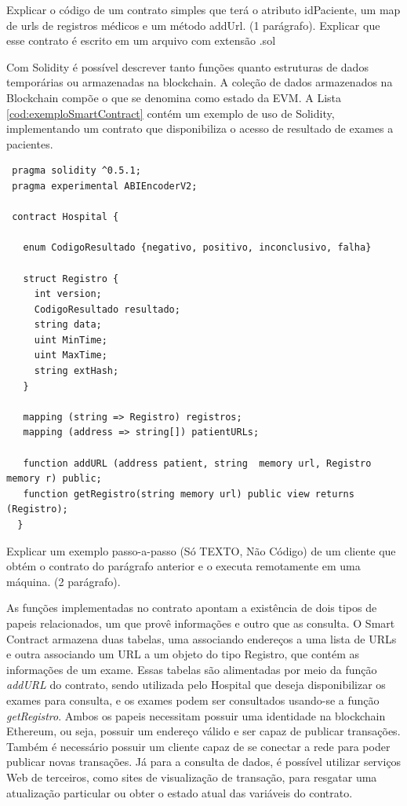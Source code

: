 \documentclass[a4paper,11pt]{article}
\begin{document}
{\color{ForestGreen}Explicar o código de um contrato simples que terá o atributo idPaciente, um map de urls de registros médicos e um método addUrl. (1 parágrafo). Explicar que esse contrato é escrito em um arquivo com extensão .sol}

Com Solidity é possível descrever tanto funções quanto estruturas de dados temporárias ou armazenadas na blockchain.
A coleção de dados armazenados na Blockchain compõe o que se denomina como estado da EVM. A Lista \ref{cod:exemploSmartContract} contém um exemplo de uso de Solidity, implementando um contrato que disponibiliza o acesso de resultado de exames a pacientes.

\begin{lstlisting}
 pragma solidity ^0.5.1;
 pragma experimental ABIEncoderV2;

 contract Hospital {

   enum CodigoResultado {negativo, positivo, inconclusivo, falha}

   struct Registro {
     int version;
     CodigoResultado resultado;
     string data;
     uint MinTime;
     uint MaxTime;
     string extHash;
   }

   mapping (string => Registro) registros;
   mapping (address => string[]) patientURLs;

   function addURL (address patient, string  memory url, Registro memory r) public;
   function getRegistro(string memory url) public view returns (Registro);
  }
\end{lstlisting}


{\color{ForestGreen}Explicar um exemplo passo-a-passo (Só TEXTO, Não Código) de um cliente que obtém o contrato do parágrafo anterior e o executa remotamente em uma máquina. (2 parágrafo).}

As funções implementadas no contrato apontam a existência de dois tipos de papeis relacionados, um que provê informações e outro que as consulta. O Smart Contract armazena duas tabelas, uma associando endereços a uma lista de URLs e outra associando um URL a um objeto do tipo Registro, que contém as informações de um exame. Essas tabelas são alimentadas por meio da função \emph{addURL} do contrato, sendo utilizada pelo Hospital que deseja disponibilizar os exames para consulta, e os exames podem ser consultados usando-se a função \emph{getRegistro}. Ambos os papeis necessitam possuir uma identidade na blockchain Ethereum, ou seja, possuir um endereço válido e ser capaz de publicar transações. Também é necessário possuir um cliente capaz de se conectar a rede para poder publicar novas transações. Já para a consulta de dados, é possível utilizar serviços Web de terceiros, como sites de visualização de transação, para resgatar uma atualização particular ou obter o estado atual das variáveis do contrato.
\end{document}
